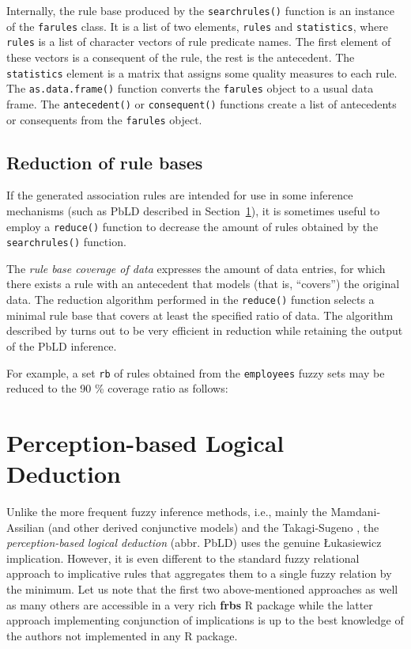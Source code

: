 \documentclass[review]{elsarticle}
\newcommand{\pkg}[1]{\textbf{#1}}
\newcommand{\proglang}[1]{#1}
\newcommand{\code}[1]{\texttt{#1}}
\begin{document}
Internally, the rule base produced by the \code{searchrules()} function is an instance of the \code{farules} class. It is a list of two elements, \code{rules} and \code{statistics}, where \code{rules} is a list of character vectors of rule predicate names. The first element of these vectors is a consequent of the rule, the rest is the antecedent. The \code{statistics} element is a matrix that assigns some quality measures to each rule. The \code{as.data.frame()} function converts the \code{farules} object to a usual data frame.
%
%
%
The \code{antecedent()} or \code{consequent()} functions create a list of antecedents or consequents from the \code{farules} object.
%
%


\subsection{Reduction of rule bases}

If the generated association rules are intended for use in some inference mechanisms (such as PbLD described in Section~\ref{sec:pbld}), it is sometimes useful to employ a \code{reduce()} function to decrease the amount of rules obtained by the \code{searchrules()} function.

The \emph{rule base coverage of data} expresses the amount of data entries, for which there exists a
rule with an antecedent that models (that is, ``covers'') the original data. The reduction algorithm performed in the \code{reduce()} function selects a minimal rule base that covers at least the specified ratio of data. The algorithm described by \cite{burda2015} turns out to be very efficient in reduction while retaining the output of the PbLD inference.

For example, a set \code{rb} of rules obtained from the \code{employees} fuzzy sets may be reduced to the 90 \% coverage ratio as follows:
%





\section{Perception-based Logical Deduction}
\label{sec:pbld}


Unlike the more frequent fuzzy inference methods, i.e., mainly the Mamdani-Assilian \citep{MamdaniAssilian75} (and other derived conjunctive models) and the Takagi-Sugeno \citep{TakagiSugeno:IEEE85}, the \emph{ perception-based logical deduction} (abbr. PbLD) uses the genuine \L ukasiewicz implication. However, it is even different to the standard fuzzy relational approach to implicative rules \citep{BodenhoferDankovaStepnickaNovak07} that aggregates them to a single fuzzy relation by the minimum. Let us note that the first two above-mentioned approaches as well as many others are accessible in a very rich \pkg{frbs} \proglang{R} package while the latter approach implementing conjunction of implications is up to the best knowledge of the authors not implemented in any \proglang{R} package. 
\end{document}
